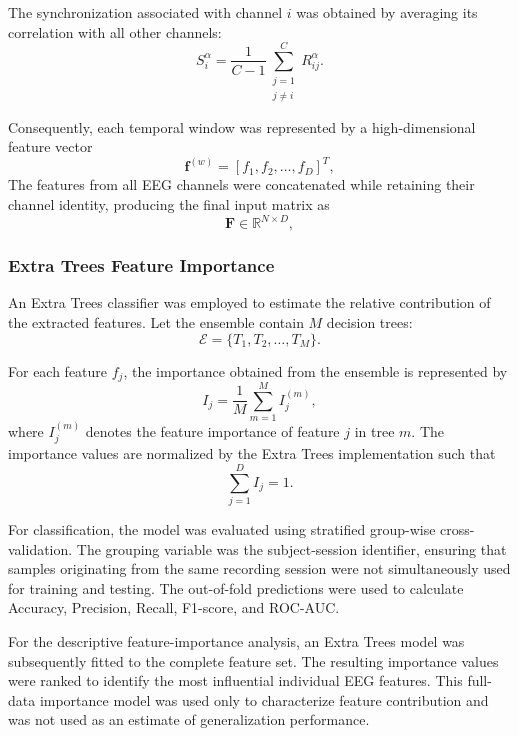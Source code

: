 \documentclass[conference]{IEEEtran}
\begin{document}
The synchronization associated with channel $i$ was obtained by averaging its correlation with all other channels:
\begin{equation}
S_i^{\alpha}
=
\frac{1}{C-1}
\sum_{\substack{j=1\\j\neq i}}^{C}
R_{ij}^{\alpha}.
\end{equation}

Consequently, each temporal window was represented by a high-dimensional feature vector
\begin{equation}
\mathbf{f}^{(w)}
=
[f_1,f_2,\ldots,f_D]^{T},
\end{equation}
The features from all EEG channels were concatenated while retaining their channel identity, producing the final input matrix as
\begin{equation}
\mathbf{F}\in\mathbb{R}^{N\times D},
\end{equation}

\subsubsection{Extra Trees Feature Importance}

An Extra Trees classifier was employed to estimate the relative contribution of the extracted features. Let the ensemble contain $M$ decision trees:
\begin{equation}
\mathcal{E}=\{T_1,T_2,\ldots,T_M\}.
\end{equation}

For each feature $f_j$, the importance obtained from the ensemble is represented by
\begin{equation}
I_j
=
\frac{1}{M}
\sum_{m=1}^{M}
I_{j}^{(m)},
\end{equation}
where $I_j^{(m)}$ denotes the feature importance of feature $j$ in tree $m$. The importance values are normalized by the Extra Trees implementation such that
\begin{equation}
\sum_{j=1}^{D}I_j=1.
\end{equation}

For classification, the model was evaluated using stratified group-wise cross-validation. The grouping variable was the subject-session identifier, ensuring that samples originating from the same recording session were not simultaneously used for training and testing. The out-of-fold predictions were used to calculate Accuracy, Precision, Recall, F1-score, and ROC-AUC.

For the descriptive feature-importance analysis, an Extra Trees model was subsequently fitted to the complete feature set. The resulting importance values were ranked to identify the most influential individual EEG features. This full-data importance model was used only to characterize feature contribution and was not used as an estimate of generalization performance.
\end{document}
